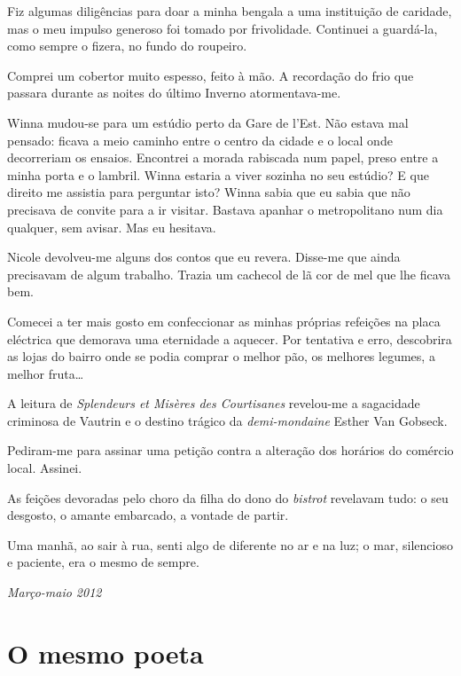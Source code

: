 Fiz algumas diligências para doar a minha bengala a uma instituição de
caridade, mas o meu impulso generoso foi tomado por frivolidade.
Continuei a guardá-la, como sempre o fizera, no fundo do roupeiro.

Comprei um cobertor muito espesso, feito à mão. A recordação do frio
que passara durante as noites do último Inverno atormentava-me.

Winna mudou-se para um estúdio perto da Gare de l'Est. Não estava mal
pensado: ficava a meio caminho entre o centro da cidade e o local onde
decorreriam os ensaios. Encontrei a morada rabiscada num papel, preso
entre a minha porta e
o lambril. Winna estaria a viver sozinha no seu estúdio? E que direito
me assistia para perguntar isto? Winna sabia que eu sabia que não
precisava de convite para a ir visitar. Bastava apanhar o metropolitano
num dia qualquer, sem avisar. Mas eu hesitava.

Nicole devolveu-me alguns dos contos que eu revera. Disse-me que ainda
precisavam de algum trabalho. Trazia um cachecol de lã cor de mel que
lhe ficava bem.

Comecei a ter mais gosto em confeccionar as minhas próprias refeições na
placa eléctrica que demorava uma eternidade a aquecer. Por tentativa e
erro, descobrira as lojas do bairro onde se podia comprar o melhor pão,
os melhores legumes, a melhor fruta\ldots{}

A leitura de \emph{Splendeurs et Misères des Courtisanes }revelou-me a sagacidade criminosa de Vautrin e o destino trágico da
\emph{demi-mondaine }Esther Van Gobseck.

Pediram-me para assinar uma petição contra a alteração dos horários do
comércio local. Assinei.

As feições devoradas pelo choro da filha do dono do \emph{bistrot
}revelavam tudo: o seu desgosto, o amante embarcado, a vontade de
partir.

Uma manhã, ao sair à rua, senti algo de diferente no ar e na luz; o mar,
silencioso e paciente, era o mesmo de sempre.

\begin{flushright}
\emph{Março-maio 2012}
\end{flushright}

\chapter{O mesmo poeta}


